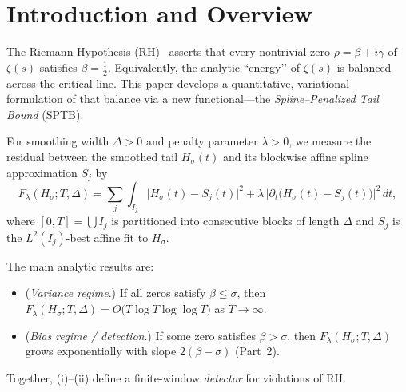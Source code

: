 
\section{Introduction and Overview}

The Riemann Hypothesis (RH)~\cite{bombieri} asserts that every nontrivial zero
$\rho = \beta + i\gamma$ of $\zeta(s)$ satisfies $\beta = \tfrac12$.
Equivalently, the analytic “energy’’ of $\zeta(s)$ is balanced across the
critical line.  This paper develops a quantitative, variational formulation
of that balance via a new functional—the
\emph{Spline–Penalized Tail Bound} (SPTB).  

For smoothing width $\Delta>0$ and penalty parameter $\lambda>0$, we measure
the residual between the smoothed tail $H_\sigma(t)$ and its blockwise affine spline
approximation $S_j$ by
\begin{equation}
F_\lambda(H_\sigma;T,\Delta)
  = \sum_{j}\!\int_{I_j}
       \bigl|H_\sigma(t)-S_j(t)\bigr|^2
       + \lambda\,\bigl|\partial_t\!\bigl(H_\sigma(t)-S_j(t)\bigr)\bigr|^2\,dt,
\label{eq:SPTB}
\end{equation}
where $[0,T] = \bigcup I_j$ is partitioned into consecutive blocks of length $\Delta$ and
$S_j$ is the $L^2(I_j)$-best affine fit to $H_\sigma$.

The main analytic results are:
\begin{itemize}
\item[(i)] (\emph{Variance regime}.) If all zeros satisfy $\beta\le\sigma$, then
$F_\lambda(H_\sigma;T,\Delta)=O\!\bigl(T\log T\log\log T\bigr)$ as $T\to\infty$.
\item[(ii)] (\emph{Bias regime / detection}.) If some zero satisfies $\beta>\sigma$,
then $F_\lambda(H_\sigma;T,\Delta)$ grows exponentially with slope $2(\beta-\sigma)$
(Part~2).
\end{itemize}
Together, (i)–(ii) define a finite-window \emph{detector} for violations of RH.

